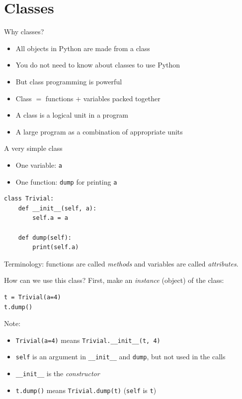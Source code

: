 \section{Classes}

\begin{frame}{Why classes?}
  \begin{block}{}
    \begin{itemize}
      \item All objects in Python are made from a class
      \item You do not need to know about classes to use Python
      \item But class programming is powerful
    \end{itemize}
  \end{block}
  \begin{block}{}
    \begin{itemize}
      \item Class $=$ functions $+$ variables packed together
      \item A class is a logical unit in a program
      \item A large program as a combination of appropriate units
    \end{itemize}
  \end{block}
\end{frame}

\begin{frame}[fragile]{A very simple class}
  \begin{itemize}
    \item One variable: \texttt{a}
    \item One function: \texttt{dump} for printing \texttt{a}
  \end{itemize}
\begin{lstlisting}[style=pythoncompact]
class Trivial:
    def __init__(self, a):
        self.a = a

    def dump(self):
        print(self.a)
\end{lstlisting}
  Terminology: functions are called \emph{methods} and variables are
  called \emph{attributes}.
\end{frame}

\begin{frame}[fragile]{How can we use this class?}
  First, make an \emph{instance} (object) of the class:
\begin{lstlisting}[style=pythoncompact]
t = Trivial(a=4)
t.dump()
\end{lstlisting}
  Note:
  \begin{itemize}
    \item \texttt{Trivial(a=4)} means \texttt{Trivial.\_\_init\_\_(t, 4)}
    \item \texttt{self} is an argument in \texttt{\_\_init\_\_} and
          \texttt{dump}, but not used in the calls
    \item \texttt{\_\_init\_\_} is the \emph{constructor}
    \item \texttt{t.dump()} means \texttt{Trivial.dump(t)}
          (\texttt{self} is \texttt{t})
  \end{itemize}
\end{frame}

